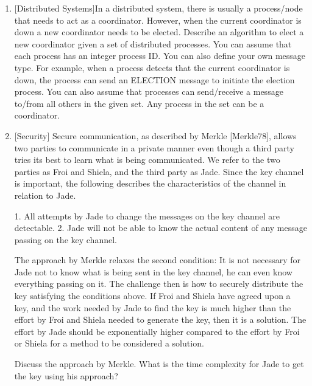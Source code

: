 \documentclass{article}
\begin{document}
\begin{enumerate}
  	\item{[Distributed Systems]In a distributed system, there is usually a process/node that needs to act as a coordinator. However, when the current coordinator is down a new coordinator needs to be elected. Describe an algorithm to elect a new coordinator given a set of distributed processes. You can assume that each process has an integer process ID. You can  also define your own message type. For example, when a process detects that the current coordinator is down, the process can send an ELECTION message to initiate the election process. You can also assume that processes can send/receive a message to/from all others in the given set. Any process in the set can be a coordinator.}
  	
	\item{[Security] Secure communication, as described by Merkle [Merkle78], allows two parties to communicate in a private manner even though a third party tries its best to learn what is being communicated. We refer to the two parties as Froi and Shiela, and the third party as Jade. Since the key channel is important, the following describes the characteristics of the channel in relation to Jade.

1. All attempts by Jade to change the messages on the key channel are detectable.
2. Jade will not be able to know the actual content of any message passing on the key channel.

The approach by Merkle relaxes the second condition: It is not necessary for Jade not to know what is being sent in the key channel, he can even know everything passing on it. The challenge then is how
to securely distribute the key satisfying the conditions above. If Froi and Shiela have agreed upon a key, and the work needed by Jade to find the key is much higher than the effort by Froi and Shiela needed
to generate the key, then it is a solution. The effort by Jade should be exponentially higher compared to the effort by Froi or Shiela for a method to be considered a solution.

Discuss the approach by Merkle. What is the time complexity for Jade to get the key using his approach?}  	
  	
\end{enumerate}
\end{document}
